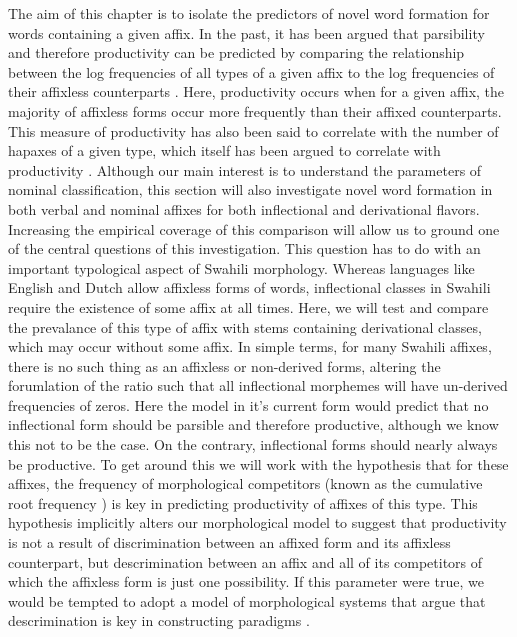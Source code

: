 \documentclass[12pt]{article}\usepackage[]{graphicx}\usepackage[]{color}
\begin{document}
The aim of this chapter is to isolate the predictors of novel word formation for words containing a given affix. In the past, it has been argued that parsibility and therefore productivity can be predicted by comparing the relationship between the log frequencies of all types of a given affix to the log frequencies of their affixless counterparts \cite{hay02}. Here, productivity occurs when for a given affix, the majority of affixless forms occur more frequently than their affixed counterparts. This measure of productivity has also been said to correlate with the number of hapaxes of a given type, which itself has been argued to correlate with productivity \cite{baay92}. Although our main interest is to understand the parameters of nominal classification, this section will also investigate novel word formation in both verbal and nominal affixes for both inflectional and derivational flavors. Increasing the empirical coverage of this comparison will allow us to ground one of the central questions of this investigation. This question has to do with an important typological aspect of Swahili morphology. Whereas languages like English and Dutch allow affixless forms of words, inflectional classes in Swahili require the existence of some affix at all times. Here, we will test and compare the prevalance of this type of affix with stems containing derivational classes, which may occur without some affix. In simple terms, for many Swahili affixes, there is no such thing as an affixless or non-derived forms, altering the forumlation of the ratio such that all inflectional morphemes will have un-derived frequencies of zeros. Here the model in it's current form would predict that no inflectional form should be parsible and therefore productive, although we  know this not to be the case. On the contrary, inflectional forms should nearly always be productive. To get around this we will work with the hypothesis that for these affixes, the frequency of morphological competitors (known as the cumulative root frequency \cite{cole89}) is key in predicting productivity of affixes of this type. This hypothesis implicitly alters our morphological model to suggest that productivity is not a result of discrimination between an affixed form and its affixless counterpart, but descrimination between an affix and all of its competitors of which the affixless form is just one possibility. If this parameter were true, we would be tempted to adopt a model of morphological systems that argue that descrimination is key in constructing paradigms \cite{blev2015}.
\end{document}
